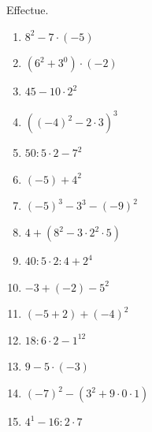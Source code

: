 %
%
	Effectue.
		\begin{enumerate}[cols=3]
		\item $8^2 - 7 \cdot (-5)$
		\item $(6^2 + 3^0)\cdot (-2)$
		\item $45-10\cdot2^2$
		\item $((-4)^2 - 2\cdot 3)^3$
		\item $50:5\cdot2 - 7^2$
		\item $(-5)+4^2$
		\item $(-5)^3 - 3^3 - (-9)^2$
		\item $4+(8^2 - 3 \cdot2^2 \cdot5)$
		\item $40:5\cdot2 : 4 + 2^4$
		\item $-3 + (-2) - 5^2$
		\item $(-5+2) + (-4)^2$
		\item $18:6\cdot 2 -1^{12}$
		\item $9-5\cdot (-3)$
		\item $(-7)^2 - (3^2 + 9 \cdot 0 \cdot 1)$
		\item $4^1 - 16:2\cdot 7$
		\end{enumerate}
